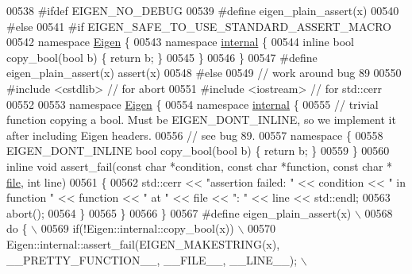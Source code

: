 \begin{DoxyCode}
00538 \textcolor{preprocessor}{#ifdef EIGEN\_NO\_DEBUG}
00539 \textcolor{preprocessor}{  #define eigen\_plain\_assert(x)}
00540 \textcolor{preprocessor}{#else}
00541 \textcolor{preprocessor}{  #if EIGEN\_SAFE\_TO\_USE\_STANDARD\_ASSERT\_MACRO}
00542     \textcolor{keyword}{namespace }\hyperlink{namespace_eigen}{Eigen} \{
00543     \textcolor{keyword}{namespace }\hyperlink{namespaceinternal}{internal} \{
00544     \textcolor{keyword}{inline} \textcolor{keywordtype}{bool} copy\_bool(\textcolor{keywordtype}{bool} b) \{ \textcolor{keywordflow}{return} b; \}
00545     \}
00546     \}
00547 \textcolor{preprocessor}{    #define eigen\_plain\_assert(x) assert(x)}
00548 \textcolor{preprocessor}{  #else}
00549     \textcolor{comment}{// work around bug 89}
00550 \textcolor{preprocessor}{    #include <cstdlib>}   \textcolor{comment}{// for abort}
00551 \textcolor{preprocessor}{    #include <iostream>}  \textcolor{comment}{// for std::cerr}
00552 
00553     \textcolor{keyword}{namespace }\hyperlink{namespace_eigen}{Eigen} \{
00554     \textcolor{keyword}{namespace }\hyperlink{namespaceinternal}{internal} \{
00555     \textcolor{comment}{// trivial function copying a bool. Must be EIGEN\_DONT\_INLINE, so we implement it after including Eigen
       headers.}
00556     \textcolor{comment}{// see bug 89.}
00557     \textcolor{keyword}{namespace }\{
00558     EIGEN\_DONT\_INLINE \textcolor{keywordtype}{bool} copy\_bool(\textcolor{keywordtype}{bool} b) \{ \textcolor{keywordflow}{return} b; \}
00559     \}
00560     \textcolor{keyword}{inline} \textcolor{keywordtype}{void} assert\_fail(\textcolor{keyword}{const} \textcolor{keywordtype}{char} *condition, \textcolor{keyword}{const} \textcolor{keywordtype}{char} *\textcolor{keyword}{function}, \textcolor{keyword}{const} \textcolor{keywordtype}{char} *
      \hyperlink{structfile}{file}, \textcolor{keywordtype}{int} line)
00561     \{
00562       std::cerr << \textcolor{stringliteral}{"assertion failed: "} << condition << \textcolor{stringliteral}{" in function "} << \textcolor{keyword}{function} << \textcolor{stringliteral}{" at "} << file << \textcolor{stringliteral}{":
      "} << line << std::endl;
00563       abort();
00564     \}
00565     \}
00566     \}
00567 \textcolor{preprocessor}{    #define eigen\_plain\_assert(x) \(\backslash\)}
00568 \textcolor{preprocessor}{      do \{ \(\backslash\)}
00569 \textcolor{preprocessor}{        if(!Eigen::internal::copy\_bool(x)) \(\backslash\)}
00570 \textcolor{preprocessor}{          Eigen::internal::assert\_fail(EIGEN\_MAKESTRING(x), \_\_PRETTY\_FUNCTION\_\_, \_\_FILE\_\_, \_\_LINE\_\_); \(\backslash\)}

\end{DoxyCode}
